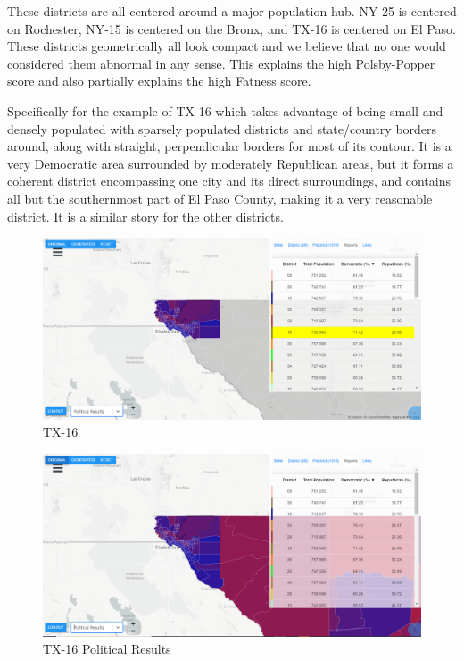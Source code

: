\documentclass[letterpaper]{article}
\begin{document}
These districts are all centered around a major population hub. NY-25 is centered on Rochester, NY-15 is centered on the Bronx, and TX-16 is centered on El Paso. These districts geometrically all look compact and we believe that no one would considered them abnormal in any sense. This explains the high Polsby-Popper score and also partially explains the high Fatness score. 

Specifically for the example of TX-16 which takes advantage of being small and densely populated with sparsely populated districts and state/country borders around, along with straight, perpendicular borders for most of its contour. It is a very Democratic area surrounded by moderately Republican areas, but it forms a coherent district encompassing one city and its direct surroundings, and contains all but the southernmost part of El Paso County, making it a very reasonable district. It is a similar story for the other districts.

\begin{figure}[H]
	\includegraphics[width=\linewidth]{./figures/TX-16.png}
	\caption{TX-16}
	\label{fig:tx16border}
\end{figure}

\begin{figure}[H]
	\includegraphics[width=\linewidth]{./figures/TX-16-SurroundingArea.png}
	\caption{TX-16 Political Results}
	\label{fig:tx16political}
\end{figure}
\end{document}
